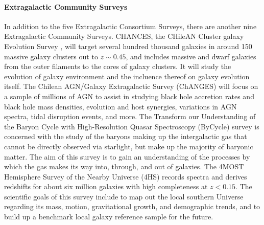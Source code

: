 \documentclass[a4paper,11pt]{article}
\begin{document}
\paragraph{Extragalactic Community Surveys}
In addition to the five Extragalactic Consortium Surveys, there are another nine Extragalactic Community Surveys. CHANCES, the CHileAN Cluster galaxy Evolution Survey \citep{4mosts15}, will target several hundred thousand galaxies in around 150 massive galaxy clusters out to $z\sim0.45$, and includes massive and dwarf galaxies from the outer filaments to the cores of galaxy clusters. It will study the evolution of galaxy environment and the incluence thereof on galaxy evolution itself. The Chilean AGN/Galaxy Extragalactic Survey (ChANGES) \citep{4mosts16} will focus on a sample of millions of AGN to assist in studying black hole accretion rates and black hole mass densities, evolution and host synergies, variations in AGN spectra, tidal disruption events, and more. The Transform our Understanding of the Baryon Cycle with High-Resolution Quasar Spectroscopy (ByCycle) survey \citep{4mosts17} is concerned with the study of the baryons making up the intergalactic gas that cannot be directly observed via starlight, but make up the majority of baryonic matter. The aim of this survey is to gain an understanding of the processes by which the gas makes its way into, through, and out of galaxies. The 4MOST Hemisphere Survey of the Nearby Universe (4HS) \citep{4mosts18} records spectra and derives redshifts for about six million galaxies with high completeness at $z<0.15$. The scientific goals of this survey include to map out the local southern Universe regarding its mass, motion, gravitational growth, and demographic trends, and to build up a benchmark local galaxy reference sample for the future.\\ \\
%
\end{document}
